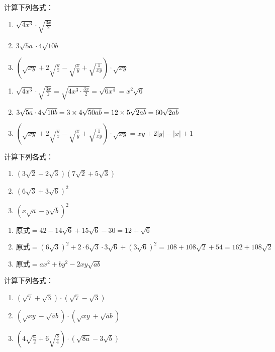 \begin{example}
    计算下列各式：
\begin{enumerate}
    \item $\sqrt{4x^3}\cdot \sqrt{\frac{3x}{2}}$
    \item $3\sqrt{5a}\cdot 4\sqrt{10b}$
\item $\left(\sqrt{xy}+2\sqrt{\frac{y}{x}}-\sqrt{\frac{x}{y}}+\sqrt{\frac{1}{xy}}\right)\cdot \sqrt{xy}$
\end{enumerate}
\end{example}

\begin{solution}
    \begin{enumerate}
        \item $\sqrt{4x^3}\cdot \sqrt{\frac{3x}{2}}=\sqrt{4x^3\cdot \frac{3x}{2}}=\sqrt{6x^4}=x^2\sqrt{6}$
        \item $3\sqrt{5a}\cdot 4\sqrt{10b}=3\times 4\sqrt{50ab}=12\times 5\sqrt{2ab}=60\sqrt{2ab}$
    \item $\left(\sqrt{xy}+2\sqrt{\frac{y}{x}}-\sqrt{\frac{x}{y}}+\sqrt{\frac{1}{xy}}\right)\cdot \sqrt{xy}=xy+2|y|-|x|+1$
    \end{enumerate}
\end{solution}


\begin{example}
    计算下列各式：
\begin{enumerate}
    \item $\left(3\sqrt{2}-2\sqrt{3}\right)\left(7\sqrt{2}+5\sqrt{3}\right)$
    \item $\left(6\sqrt{3}+3\sqrt{6}\right)^2$
    \item $\left(x\sqrt{a}-y\sqrt{b}\right)^2$
\end{enumerate}
\end{example}

\begin{solution}
    \begin{enumerate}
    \item $\text{原式}=42-14\sqrt{6}+15\sqrt{6}-30=12+\sqrt{6}$
    \item $\text{原式}=\left(6\sqrt{3}\right)^2+2\cdot 6\sqrt{3}\cdot 3\sqrt{6}+\left(3\sqrt{6}\right)^2=108+108\sqrt{2}+54=162+108\sqrt{2}$
    \item $\text{原式}=ax^2+by^2-2xy\sqrt{ab}$
\end{enumerate}
\end{solution}


\begin{example}
    计算下列各式：
\begin{multicols}{2}
    \begin{enumerate}
    \item $\left(\sqrt{7}+\sqrt{3}\right)\cdot \left(\sqrt{7}-\sqrt{3}\right)$
    \item $\left(\sqrt{xy}-\sqrt{ab}\right)\cdot \left(\sqrt{xy}+\sqrt{ab}\right)$
    \item $\left(4\sqrt{\frac{a}{2}}+6\sqrt{\frac{b}{4}}\right)\cdot \left(\sqrt{8a}-3\sqrt{b}\right)$
\end{enumerate}
\end{multicols}
\end{example}

